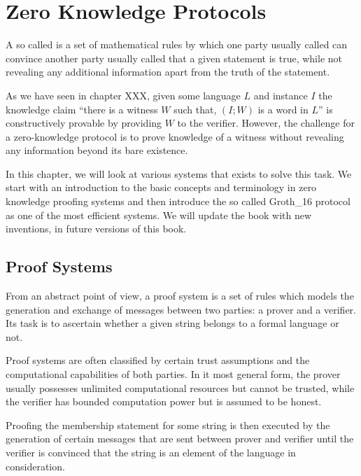\chapter{Zero Knowledge Protocols}
A so called  is a set of mathematical rules by which one party usually called  can convince another party usually called  that a given statement is true, while not revealing any additional information apart from the truth of the statement. 

As we have seen in chapter XXX, given some language $L$ and instance $I$ the knowledge claim ``there is a witness $W$ such that,  $(I;W)$ is a word in $L$'' is constructively provable by providing $W$ to the verifier. However, the challenge for a zero-knowledge protocol is to prove knowledge of a witness without revealing any information beyond its bare existence.

In this chapter, we will look at various systems that exists to solve this task. We start with an introduction to the basic concepts and terminology in zero knowledge proofing systems and then introduce the so called Groth\_16 protocol as one of the most efficient systems. We will update the book with new inventions, in future versions of this book.

\section{Proof Systems}
From an abstract point of view, a proof system is a set of rules which models the generation and exchange of messages between two parties: a prover and a verifier. Its task is to ascertain whether a given string belongs to a formal language or not.  

Proof systems are often classified by certain trust assumptions and the computational capabilities of both parties. In it most general form, the prover usually possesses unlimited computational resources but cannot be trusted, while the verifier has bounded computation power but is assumed to be honest.

Proofing the membership statement for some string is then executed by the generation of certain messages that are sent between prover and verifier until the verifier is convinced that the string is an element of the language in consideration.

